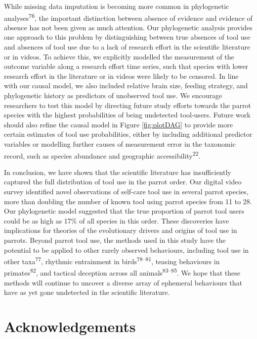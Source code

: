 \documentclass[
  man, donotrepeattitle,floatsintext]{apa6}
\begin{document}
While missing data imputation is becoming more common in phylogenetic
analyses\textsuperscript{76}, the important distinction between absence of
evidence and evidence of absence has not been given as much attention. Our
phylogenetic analysis provides one approach to this problem by distinguishing
between true absences of tool use and absences of tool use due to a lack of
research effort in the scientific literature or in videos. To achieve this, we
explicitly modelled the measurement of the outcome variable along a research
effort time series, such that species with lower research effort in the
literature or in videos were likely to be censored. In line with our causal
model, we also included relative brain size, feeding strategy, and phylogenetic
history as predictors of unobserved tool use. We encourage researchers to test
this model by directing future study efforts towards the parrot species with the
highest probabilities of being undetected tool-users. Future work should also
refine the causal model in Figure \ref{fig:plotDAG} to provide more certain
estimates of tool use probabilities, either by including additional predictor
variables or modelling further causes of measurement error in the taxonomic
record, such as species abundance and geographic accessibility\textsuperscript{22}.

In conclusion, we have shown that the scientific literature has insufficiently
captured the full distribution of tool use in the parrot order. Our
digital video survey identified novel observations of self-care tool use in
several parrot species, more than doubling the number of known tool using parrot
species from 11 to 28. Our phylogenetic model suggested that the true
proportion of parrot tool users could be as high as 17\% of all species in this
order. These discoveries have implications for theories of the evolutionary
drivers and origins of tool use in parrots. Beyond parrot tool use, the
methods used in this study have the potential to be applied to other rarely
observed behaviours, including tool use in other taxa\textsuperscript{77}, rhythmic
entrainment in birds\textsuperscript{78--81},
teasing behaviours in primates\textsuperscript{82}, and tactical deception across all
animals\textsuperscript{83--85}. We hope that these methods
will continue to uncover a diverse array of ephemeral behaviours that have as
yet gone undetected in the scientific literature.

\newpage
\nolinenumbers

\hypertarget{acknowledgements}{%
\section{Acknowledgements}\label{acknowledgements}}
\end{document}
